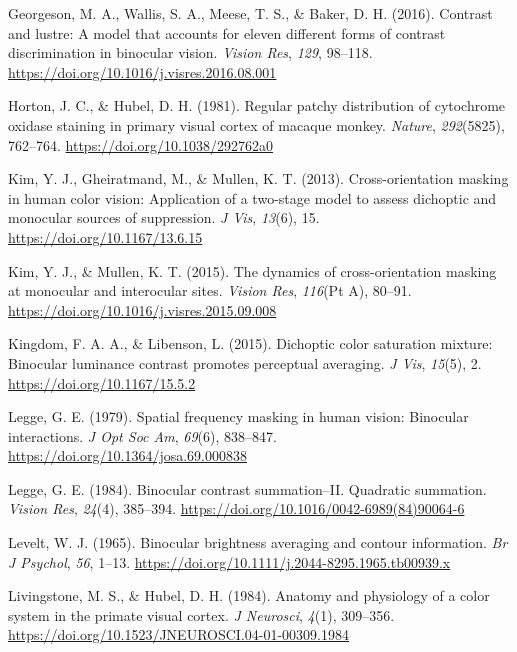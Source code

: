 \documentclass[
]{article}
\newlength{\cslhangindent}
\newlength{\cslentryspacingunit} %
\newenvironment{CSLReferences}[2] %
 {%
  \setlength{\parindent}{0pt}
  \ifodd #1
  \let\oldpar\par
  \def\par{\hangindent=\cslhangindent\oldpar}
  \fi
  \setlength{\parskip}{#2\cslentryspacingunit}
 }%
 {}
\begin{document}
\begin{CSLReferences}{1}{0}
\leavevmode{}%
Georgeson, M. A., Wallis, S. A., Meese, T. S., \& Baker, D. H. (2016). Contrast and lustre: A model that accounts for eleven different forms of contrast discrimination in binocular vision. \emph{Vision Res}, \emph{129}, 98--118. \url{https://doi.org/10.1016/j.visres.2016.08.001}

\leavevmode{}%
Horton, J. C., \& Hubel, D. H. (1981). Regular patchy distribution of cytochrome oxidase staining in primary visual cortex of macaque monkey. \emph{Nature}, \emph{292}(5825), 762--764. \url{https://doi.org/10.1038/292762a0}

\leavevmode{}%
Kim, Y. J., Gheiratmand, M., \& Mullen, K. T. (2013). Cross-orientation masking in human color vision: Application of a two-stage model to assess dichoptic and monocular sources of suppression. \emph{J Vis}, \emph{13}(6), 15. \url{https://doi.org/10.1167/13.6.15}

\leavevmode{}%
Kim, Y. J., \& Mullen, K. T. (2015). The dynamics of cross-orientation masking at monocular and interocular sites. \emph{Vision Res}, \emph{116}(Pt A), 80--91. \url{https://doi.org/10.1016/j.visres.2015.09.008}

\leavevmode{}%
Kingdom, F. A. A., \& Libenson, L. (2015). Dichoptic color saturation mixture: Binocular luminance contrast promotes perceptual averaging. \emph{J Vis}, \emph{15}(5), 2. \url{https://doi.org/10.1167/15.5.2}

\leavevmode{}%
Legge, G. E. (1979). Spatial frequency masking in human vision: Binocular interactions. \emph{J Opt Soc Am}, \emph{69}(6), 838--847. \url{https://doi.org/10.1364/josa.69.000838}

\leavevmode{}%
Legge, G. E. (1984). Binocular contrast summation--II. Quadratic summation. \emph{Vision Res}, \emph{24}(4), 385--394. \url{https://doi.org/10.1016/0042-6989(84)90064-6}

\leavevmode{}%
Levelt, W. J. (1965). Binocular brightness averaging and contour information. \emph{Br J Psychol}, \emph{56}, 1--13. \url{https://doi.org/10.1111/j.2044-8295.1965.tb00939.x}

\leavevmode{}%
Livingstone, M. S., \& Hubel, D. H. (1984). Anatomy and physiology of a color system in the primate visual cortex. \emph{J Neurosci}, \emph{4}(1), 309--356. \url{https://doi.org/10.1523/JNEUROSCI.04-01-00309.1984}


\end{CSLReferences}
\end{document}
